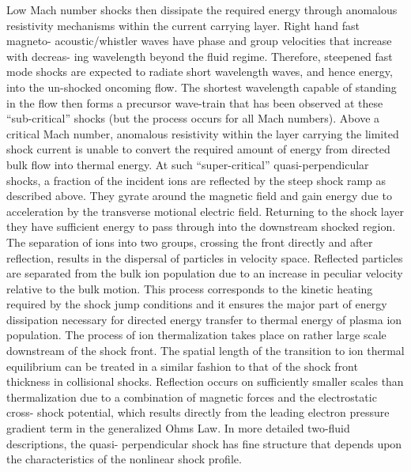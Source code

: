 \documentclass[12pt,a4paper]{article}
\begin{document}
Low Mach number shocks then dissipate the required energy through anomalous resistivity mechanisms within the current carrying layer. Right hand fast magneto- acoustic/whistler waves have phase and group velocities that increase with decreas- ing wavelength beyond the fluid regime. Therefore, steepened fast mode shocks are expected to radiate short wavelength waves, and hence energy, into the un-shocked oncoming flow. The shortest wavelength capable of standing in the flow then forms a precursor wave-train that has been observed at these “sub-critical” shocks (but the process occurs for all Mach numbers). Above a critical Mach number, anomalous resistivity within the layer carrying the limited shock current is unable to convert the required amount of energy from directed bulk flow into thermal energy. At such “super-critical” quasi-perpendicular shocks, a fraction of the incident ions are reflected by the steep shock ramp as described above. They gyrate around the magnetic field and gain energy due to acceleration by the transverse motional electric field. Returning to the shock layer they have sufficient energy to pass through into the downstream shocked region. The separation of ions into two groups, crossing the front directly and after reflection, results in the dispersal of particles in velocity space. Reflected particles are separated from the bulk ion population due to an increase in peculiar velocity relative to the bulk motion. This process corresponds to the kinetic heating required by the shock jump conditions and it ensures the major part of energy dissipation necessary for directed energy transfer to thermal energy of plasma ion population. The process of ion thermalization takes place on rather large scale downstream of the shock front. The spatial length of the transition to ion thermal equilibrium can be treated in a similar fashion to that of the shock front thickness in collisional shocks. Reflection occurs on sufficiently smaller scales than thermalization due to a combination of magnetic forces and the electrostatic cross- shock potential, which results directly from the leading electron pressure gradient term in the generalized Ohms Law. In more detailed two-fluid descriptions, the quasi- perpendicular shock has fine structure that depends upon the characteristics of the nonlinear shock profile.
\end{document}
